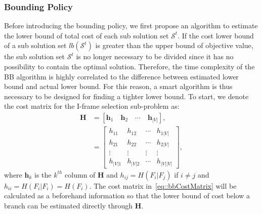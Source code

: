 \subsubsection{Bounding Policy}
Before introducing the bounding policy, we first propose an algorithm to estimate the lower bound of total cost of each sub solution set $\mathcal{S}^t$.
If the cost lower bound of a sub solution set $lb(\mathcal{S}^t)$ is greater than the upper bound of objective value, the sub solution set $\mathcal{S}^t$ is no longer necessary to be divided since it has no possibility to contain the optimal solution.
Therefore, the time complexity of the BB algorithm is highly correlated to the difference between estimated lower bound and actual lower bound.
For this reason, a smart algorithm is thus necessary to be designed for finding a tighter lower bound.
To start, we denote the cost matrix for the I-frame selection sub-problem as:
\begin{align}
\mathbf{H}
&= \left[ \mathbf{h}_1 \quad \mathbf{h}_2 \quad \cdots \quad \mathbf{h}_{|V|} \right], \nonumber \\
&= \left[ \begin{array}{cccc}
h_{11} &h_{12} &\cdots &h_{1|V|} \\
h_{21} &h_{22} &\cdots &h_{2|V|} \\
\vdots &\vdots &\vdots &\vdots \\
h_{|V|1} &h_{|V|2} &\cdots &h_{|V||V|}
\end{array} \right],
\label{eq::bbCostMatrix}
\end{align}
where $\mathbf{h}_k$ is the $k^{th}$ column of $\mathbf{H}$ and ${h_{ij} = H(F_i|F_j)}$ if ${i \neq j}$ and ${h_{ii}=H(F_i|F_i)=H(F_i)}$.
The cost matrix in~\eqref{eq::bbCostMatrix} will be calculated as a beforehand information so that the lower bound of cost below a branch can be estimated directly through $\mathbf{H}$.

